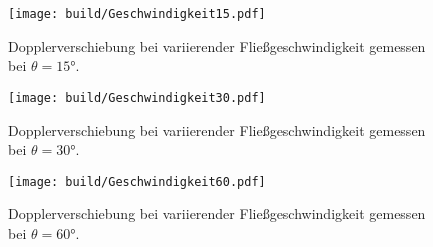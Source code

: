 \begin{figure}[H]
  \centering
  \texttt{[image: build/Geschwindigkeit15.pdf]}
  \caption{Dopplerverschiebung bei variierender Fließgeschwindigkeit gemessen bei $\theta=15°$.}
  \label{fig:v15}
\end{figure}

\begin{figure}[H]
  \centering
  \texttt{[image: build/Geschwindigkeit30.pdf]}
  \caption{Dopplerverschiebung bei variierender Fließgeschwindigkeit gemessen bei $\theta=30°$.}
  \label{fig:v30}
\end{figure}

\begin{figure}[H]
  \centering
  \texttt{[image: build/Geschwindigkeit60.pdf]}
  \caption{Dopplerverschiebung bei variierender Fließgeschwindigkeit gemessen bei $\theta=60°$.}
  \label{fig:v60}
\end{figure}

